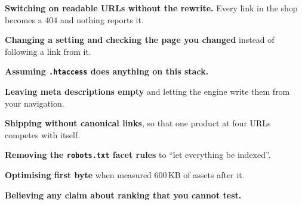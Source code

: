 \begin{pitfall}
\begin{tight}
  \item \textbf{Switching on readable URLs without the rewrite.} Every link in
        the shop becomes a 404 and nothing reports it.
  \item \textbf{Changing a setting and checking the page you changed} instead
        of following a link from it.
  \item \textbf{Assuming \texttt{.htaccess} does anything on this stack.}
  \item \textbf{Leaving meta descriptions empty} and letting the engine write
        them from your navigation.
  \item \textbf{Shipping without canonical links}, so that one product at four
        URLs competes with itself.
  \item \textbf{Removing the \texttt{robots.txt} facet rules} to ``let
        everything be indexed''.
  \item \textbf{Optimising first byte} when  measured 600\,KB of
        assets after it.
  \item \textbf{Believing any claim about ranking that you cannot test.}
\end{tight}
\end{pitfall}

